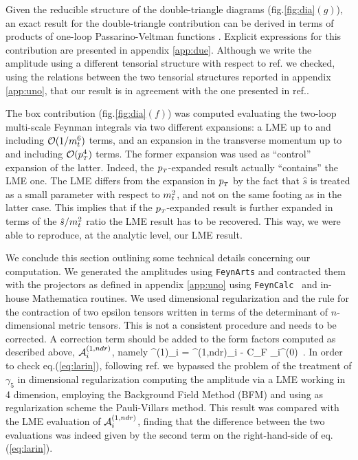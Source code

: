 Given the reducible structure of the double-triangle diagrams
(fig.\ref{fig:dia}$(g)$), an exact result for the double-triangle contribution
can be derived in terms of products of one-loop Passarino-Veltman functions
\cite{Passarino:1978jh}.     
Explicit expressions for this contribution are presented in
appendix \ref{app:due}. Although we write the amplitude using a different
tensorial structure with respect to ref.\cite{Davies:2020drs} we checked,
using the relations between the two tensorial structures reported in appendix
\ref{app:uno}, that our result is in agreement with the one presented
in ref.\cite{Hasselhuhn:2016rqt}.

The box contribution (fig.\ref{fig:dia}$(f)$) was computed evaluating
the two-loop multi-scale Feynman integrals via two different expansions:
a LME up to and including $\mathcal{O}(1/m_t^6)$ terms, and  an
expansion in the transverse momentum up to and including
${\cal O}(p_{\scriptscriptstyle T}^4)$ terms.
The former expansion was used as ``control'' expansion of the latter.
Indeed, the $p_{\scriptscriptstyle T}$-expanded result actually ``contains'' the LME one. The LME
differs from the expansion in $p_{\scriptscriptstyle T}$ by the fact that $\hat{s}$ is
treated as a small parameter with respect to $m_t^2$, and not on the same
footing as in the latter case. This implies that if the $p_{\scriptscriptstyle T}$-expanded result is
further expanded in terms of the  $\hat{s}/m_t^2$ ratio the LME result has to
be recovered. This way, we were able to reproduce, at the analytic level,
our LME result. 


We conclude this section outlining some technical details concerning our
computation.  We generated the amplitudes using \texttt{FeynArts} \cite{Hahn:2000kx} and
contracted them with the projectors as defined in appendix \ref{app:uno}
using \texttt{FeynCalc }\cite{Mertig:1990an,Shtabovenko:2016sxi} and in-house
Mathematica routines.  We used  dimensional regularization and
the rule for the contraction of two epsilon tensors written in terms of
the determinant of $n$-dimensional metric tensors. This is not a consistent
procedure and  needs to be corrected. A correction term should be added
\cite{Larin:1993tq} to the form factors computed as described
above, ${\cal A}^{(1,ndr)}_i$, namely
\beq
\amp^{(1)}_i = \amp^{(1,ndr)}_i -\frac{\as}{\pi} C_F \amp_i^{(0)}~.
\label{eq:larin}
\eeq
In order to check eq.(\ref{eq:larin}), following ref.\cite{Degrassi:2011vq}
we bypassed the problem of the treatment of 
$\gamma_5$ in dimensional regularization computing the amplitude via
a LME working in 4 dimension, employing the Background Field Method (BFM)
\cite{Abbott:1980hw} and using as regularization scheme  the Pauli-Villars
method. This result was compared with the LME evaluation of
${\cal A}^{(1,ndr)}_i$, finding that the difference between the two
evaluations was indeed given by the second term on the right-hand-side of
eq.(\ref{eq:larin}).

